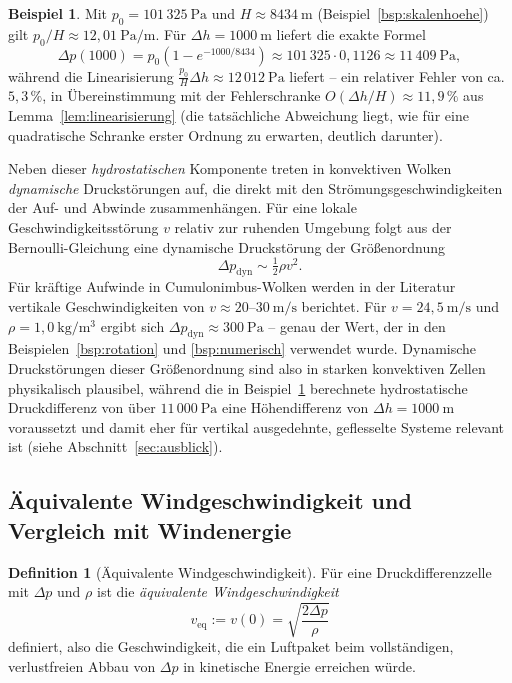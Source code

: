 ﻿\documentclass[a4paper,12pt]{article}
\theoremstyle{definition}
\newtheorem{definition}{Definition}
\newtheorem{beispiel}{Beispiel}
\begin{document}
\begin{beispiel}
	\label{bsp:linearisierung}
	Mit $p_0 = 101\,325\ \mathrm{Pa}$ und $H \approx 8434\ \mathrm{m}$
	(Beispiel~\ref{bsp:skalenhoehe}) gilt $p_0/H \approx 12{,}01\
	\mathrm{Pa/m}$. Für $\Delta h = 1000\ \mathrm{m}$ liefert die exakte
	Formel
	\[
		\Delta p(1000) = p_0\left(1 - e^{-1000/8434}\right)
		\approx 101\,325 \cdot 0{,}1126
		\approx 11\,409\ \mathrm{Pa},
	\]
	während die Linearisierung $\frac{p_0}{H}\Delta h \approx 12\,012\
	\mathrm{Pa}$ liefert -- ein relativer Fehler von ca.\ $5{,}3\,\%$,
	in Übereinstimmung mit der Fehlerschranke $O(\Delta h/H) \approx
	11{,}9\,\%$ aus Lemma~\ref{lem:linearisierung} (die tatsächliche
	Abweichung liegt, wie für eine quadratische Schranke erster Ordnung
	zu erwarten, deutlich darunter).
\end{beispiel}

Neben dieser \emph{hydrostatischen} Komponente treten in konvektiven
Wolken \emph{dynamische} Druckstörungen auf, die direkt mit den
Strömungsgeschwindigkeiten der Auf- und Abwinde zusammenhängen. Für eine
lokale Geschwindigkeitsstörung $v$ relativ zur ruhenden Umgebung folgt aus
der Bernoulli-Gleichung eine dynamische Druckstörung der Größenordnung
\[
	\Delta p_{\mathrm{dyn}} \sim \tfrac{1}{2}\rho v^2.
\]
Für kräftige Aufwinde in Cumulonimbus-Wolken werden in der Literatur
vertikale Geschwindigkeiten von $v \approx 20$--$30\ \mathrm{m/s}$
berichtet. Für $v = 24{,}5\ \mathrm{m/s}$ und $\rho = 1{,}0\
\mathrm{kg/m^3}$ ergibt sich $\Delta p_{\mathrm{dyn}} \approx
300\ \mathrm{Pa}$ -- genau der Wert, der in den
Beispielen~\ref{bsp:rotation} und \ref{bsp:numerisch} verwendet wurde.
Dynamische Druckstörungen dieser Größenordnung sind also in starken
konvektiven Zellen physikalisch plausibel, während die in
Beispiel~\ref{bsp:linearisierung} berechnete hydrostatische
Druckdifferenz von über $11\,000\ \mathrm{Pa}$ eine Höhendifferenz von
$\Delta h = 1000\ \mathrm{m}$ voraussetzt und damit eher für vertikal
ausgedehnte, geflesselte Systeme relevant ist (siehe
Abschnitt~\ref{sec:ausblick}).

\subsection{Äquivalente Windgeschwindigkeit und Vergleich mit Windenergie}

\begin{definition}[Äquivalente Windgeschwindigkeit]
	Für eine Druckdifferenzzelle mit $\Delta p$ und $\rho$ ist die
	\emph{äquivalente Windgeschwindigkeit}
	\[
		v_{\mathrm{eq}} := v(0) = \sqrt{\frac{2\Delta p}{\rho}}
	\]
	definiert, also die Geschwindigkeit, die ein Luftpaket beim
	vollständigen, verlustfreien Abbau von $\Delta p$ in kinetische
	Energie erreichen würde.
\end{definition}
\end{document}
